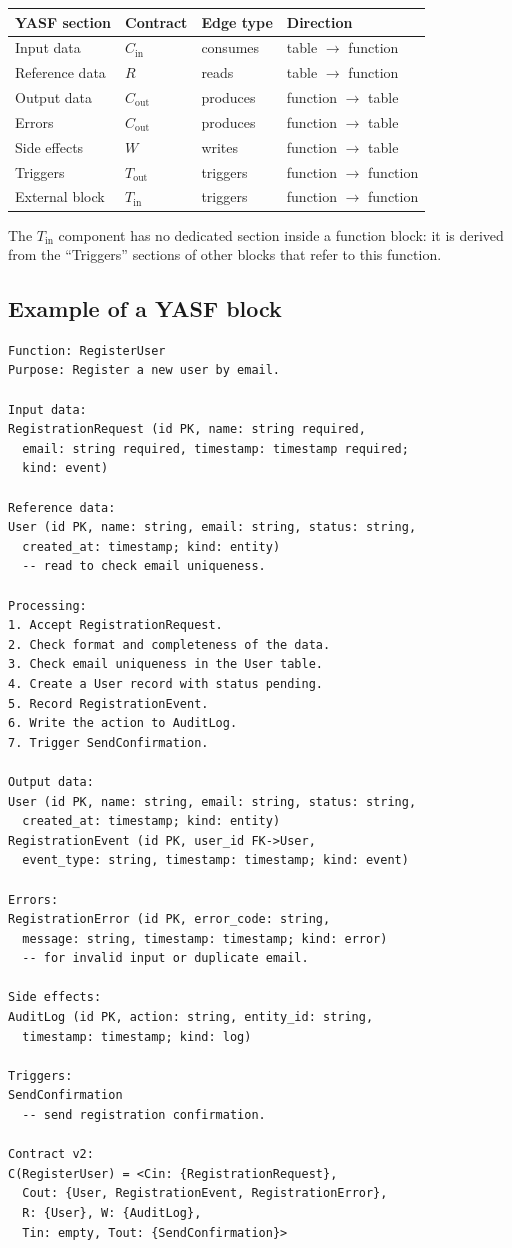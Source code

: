 \begin{tabular}{llll}
\hline
\textbf{YASF section} & \textbf{Contract} & \textbf{Edge type} & \textbf{Direction} \\
\hline
Input data & $C_{\mathrm{in}}$ & consumes & table $\to$ function \\
Reference data & $R$ & reads & table $\to$ function \\
Output data & $C_{\mathrm{out}}$ & produces & function $\to$ table \\
Errors & $C_{\mathrm{out}}$ & produces & function $\to$ table \\
Side effects & $W$ & writes & function $\to$ table \\
Triggers & $T_{\mathrm{out}}$ & triggers & function $\to$ function \\
External block & $T_{\mathrm{in}}$ & triggers & function $\to$ function \\
\hline
\end{tabular}

\vspace{0.5em}
The $T_{\mathrm{in}}$ component has no dedicated section inside a function block: it is derived from the ``Triggers'' sections of other blocks that refer to this function.

\subsection{Example of a YASF block}

\begin{lstlisting}
Function: RegisterUser
Purpose: Register a new user by email.

Input data:
RegistrationRequest (id PK, name: string required,
  email: string required, timestamp: timestamp required;
  kind: event)

Reference data:
User (id PK, name: string, email: string, status: string,
  created_at: timestamp; kind: entity)
  -- read to check email uniqueness.

Processing:
1. Accept RegistrationRequest.
2. Check format and completeness of the data.
3. Check email uniqueness in the User table.
4. Create a User record with status pending.
5. Record RegistrationEvent.
6. Write the action to AuditLog.
7. Trigger SendConfirmation.

Output data:
User (id PK, name: string, email: string, status: string,
  created_at: timestamp; kind: entity)
RegistrationEvent (id PK, user_id FK->User,
  event_type: string, timestamp: timestamp; kind: event)

Errors:
RegistrationError (id PK, error_code: string,
  message: string, timestamp: timestamp; kind: error)
  -- for invalid input or duplicate email.

Side effects:
AuditLog (id PK, action: string, entity_id: string,
  timestamp: timestamp; kind: log)

Triggers:
SendConfirmation
  -- send registration confirmation.

Contract v2:
C(RegisterUser) = <Cin: {RegistrationRequest},
  Cout: {User, RegistrationEvent, RegistrationError},
  R: {User}, W: {AuditLog},
  Tin: empty, Tout: {SendConfirmation}>
\end{lstlisting}


